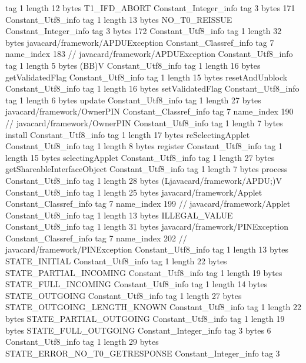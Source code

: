 {{{			tag	1
			length	12
			bytes	T1_IFD_ABORT
		}
		Constant_Integer_info {
			tag	3
			bytes	171
		}
		Constant_Utf8_info {
			tag	1
			length	13
			bytes	NO_T0_REISSUE
		}
		Constant_Integer_info {
			tag	3
			bytes	172
		}
		Constant_Utf8_info {
			tag	1
			length	32
			bytes	javacard/framework/APDUException
		}
		Constant_Classref_info {
			tag	7
			name_index	183		// javacard/framework/APDUException
		}
		Constant_Utf8_info {
			tag	1
			length	5
			bytes	(BB)V
		}
		Constant_Utf8_info {
			tag	1
			length	16
			bytes	getValidatedFlag
		}
		Constant_Utf8_info {
			tag	1
			length	15
			bytes	resetAndUnblock
		}
		Constant_Utf8_info {
			tag	1
			length	16
			bytes	setValidatedFlag
		}
		Constant_Utf8_info {
			tag	1
			length	6
			bytes	update
		}
		Constant_Utf8_info {
			tag	1
			length	27
			bytes	javacard/framework/OwnerPIN
		}
		Constant_Classref_info {
			tag	7
			name_index	190		// javacard/framework/OwnerPIN
		}
		Constant_Utf8_info {
			tag	1
			length	7
			bytes	install
		}
		Constant_Utf8_info {
			tag	1
			length	17
			bytes	reSelectingApplet
		}
		Constant_Utf8_info {
			tag	1
			length	8
			bytes	register
		}
		Constant_Utf8_info {
			tag	1
			length	15
			bytes	selectingApplet
		}
		Constant_Utf8_info {
			tag	1
			length	27
			bytes	getShareableInterfaceObject
		}
		Constant_Utf8_info {
			tag	1
			length	7
			bytes	process
		}
		Constant_Utf8_info {
			tag	1
			length	28
			bytes	(Ljavacard/framework/APDU;)V
		}
		Constant_Utf8_info {
			tag	1
			length	25
			bytes	javacard/framework/Applet
		}
		Constant_Classref_info {
			tag	7
			name_index	199		// javacard/framework/Applet
		}
		Constant_Utf8_info {
			tag	1
			length	13
			bytes	ILLEGAL_VALUE
		}
		Constant_Utf8_info {
			tag	1
			length	31
			bytes	javacard/framework/PINException
		}
		Constant_Classref_info {
			tag	7
			name_index	202		// javacard/framework/PINException
		}
		Constant_Utf8_info {
			tag	1
			length	13
			bytes	STATE_INITIAL
		}
		Constant_Utf8_info {
			tag	1
			length	22
			bytes	STATE_PARTIAL_INCOMING
		}
		Constant_Utf8_info {
			tag	1
			length	19
			bytes	STATE_FULL_INCOMING
		}
		Constant_Utf8_info {
			tag	1
			length	14
			bytes	STATE_OUTGOING
		}
		Constant_Utf8_info {
			tag	1
			length	27
			bytes	STATE_OUTGOING_LENGTH_KNOWN
		}
		Constant_Utf8_info {
			tag	1
			length	22
			bytes	STATE_PARTIAL_OUTGOING
		}
		Constant_Utf8_info {
			tag	1
			length	19
			bytes	STATE_FULL_OUTGOING
		}
		Constant_Integer_info {
			tag	3
			bytes	6
		}
		Constant_Utf8_info {
			tag	1
			length	29
			bytes	STATE_ERROR_NO_T0_GETRESPONSE
		}
		Constant_Integer_info {
			tag	3
}}}
